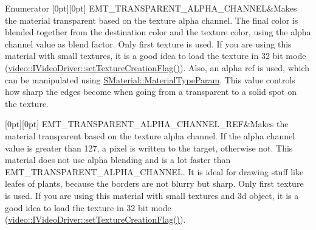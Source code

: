\begin{DoxyEnumFields}{Enumerator}
[0pt][0pt]{}\mbox{\label{namespaceirr_1_1video_ac8e9b6c66f7cebabd1a6d30cbc5430f1ac08aa3715ad41281472202107a81f736}} 
E\+M\+T\+\_\+\+T\+R\+A\+N\+S\+P\+A\+R\+E\+N\+T\+\_\+\+A\+L\+P\+H\+A\+\_\+\+C\+H\+A\+N\+N\+EL&Makes the material transparent based on the texture alpha channel. The final color is blended together from the destination color and the texture color, using the alpha channel value as blend factor. Only first texture is used. If you are using this material with small textures, it is a good idea to load the texture in 32 bit mode (\hyperlink{classirr_1_1video_1_1IVideoDriver_a868b58a6b86b9e4841ca3879ce246c4e}{video\+::\+I\+Video\+Driver\+::set\+Texture\+Creation\+Flag()}). Also, an alpha ref is used, which can be manipulated using \hyperlink{classirr_1_1video_1_1SMaterial_aefe0acce491efa8dedcd2b7cb49f8133}{S\+Material\+::\+Material\+Type\+Param}. This value controls how sharp the edges become when going from a transparent to a solid spot on the texture. \\
\hline

[0pt][0pt]{}\mbox{\label{namespaceirr_1_1video_ac8e9b6c66f7cebabd1a6d30cbc5430f1a167b3eb9c4c09ee1f145d914f4ddb619}} 
E\+M\+T\+\_\+\+T\+R\+A\+N\+S\+P\+A\+R\+E\+N\+T\+\_\+\+A\+L\+P\+H\+A\+\_\+\+C\+H\+A\+N\+N\+E\+L\+\_\+\+R\+EF&Makes the material transparent based on the texture alpha channel. If the alpha channel value is greater than 127, a pixel is written to the target, otherwise not. This material does not use alpha blending and is a lot faster than E\+M\+T\+\_\+\+T\+R\+A\+N\+S\+P\+A\+R\+E\+N\+T\+\_\+\+A\+L\+P\+H\+A\+\_\+\+C\+H\+A\+N\+N\+EL. It is ideal for drawing stuff like leafes of plants, because the borders are not blurry but sharp. Only first texture is used. If you are using this material with small textures and 3d object, it is a good idea to load the texture in 32 bit mode (\hyperlink{classirr_1_1video_1_1IVideoDriver_a868b58a6b86b9e4841ca3879ce246c4e}{video\+::\+I\+Video\+Driver\+::set\+Texture\+Creation\+Flag()}). \\
\hline


\end{DoxyEnumFields}
